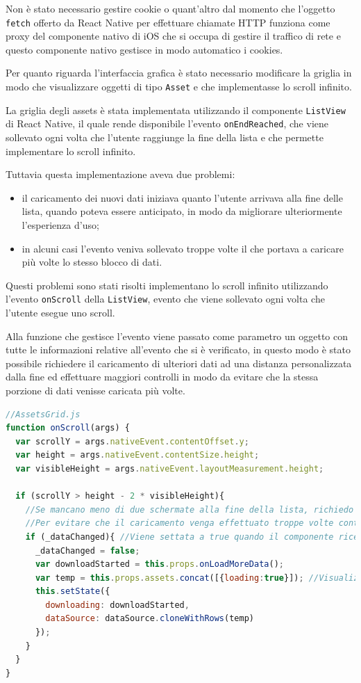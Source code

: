 Non è stato necessario gestire cookie o quant'altro dal momento che l'oggetto \texttt{fetch} offerto da React Native per effettuare chiamate HTTP funziona come proxy del componente nativo di iOS che si occupa di gestire il traffico di rete e questo componente nativo gestisce in modo automatico i cookies.

Per quanto riguarda l'interfaccia grafica è stato necessario modificare la griglia in modo che visualizzare oggetti di tipo \texttt{Asset} e che implementasse lo scroll infinito.

La griglia degli assets è stata implementata utilizzando il componente \texttt{ListView} di React Native, il quale rende disponibile l'evento \texttt{onEndReached}, che viene sollevato ogni volta che l'utente raggiunge la fine della lista e che permette implementare lo scroll infinito. 

Tuttavia questa implementazione aveva due problemi:
\begin{itemize}
\item il caricamento dei nuovi dati iniziava quanto l'utente arrivava alla fine delle lista, quando poteva essere anticipato, in modo da migliorare ulteriormente l'esperienza d'uso;
\item in alcuni casi l'evento veniva sollevato troppe volte il che portava a caricare più volte lo stesso blocco di dati.
\end{itemize}

Questi problemi sono stati risolti implementano lo scroll infinito utilizzando l'evento \texttt{onScroll} della \texttt{ListView}, evento che viene sollevato ogni volta che l'utente esegue uno scroll.

Alla funzione che gestisce l'evento viene passato come parametro un oggetto con tutte le informazioni relative all'evento che si è verificato, in questo modo è stato possibile richiedere il caricamento di ulteriori dati ad una distanza personalizzata dalla fine ed effettuare maggiori controlli in modo da evitare che la stessa porzione di dati venisse caricata più volte.

\begin{lstlisting}[language=JavaScript, caption=Funzione che gestisce l'evento onScroll della griglia che visualizza gli assets]
//AssetsGrid.js
function onScroll(args) {
  var scrollY = args.nativeEvent.contentOffset.y;
  var height = args.nativeEvent.contentSize.height;
  var visibleHeight = args.nativeEvent.layoutMeasurement.height;

  if (scrollY > height - 2 * visibleHeight){
    //Se mancano meno di due schermate alla fine della lista, richiedo il caricamento di ulteriori dati
    //Per evitare che il caricamento venga effettuato troppe volte controllo che i dati siano cambiati rispetto all'ultima volta che ho effettuato il caricamento.
    if (_dataChanged){ //Viene settata a true quando il componente riceve dei dati nuovi
      _dataChanged = false;
      var downloadStarted = this.props.onLoadMoreData();
      var temp = this.props.assets.concat([{loading:true}]); //Visualizza un'indicatore di caricamento
      this.setState({
        downloading: downloadStarted,
        dataSource: dataSource.cloneWithRows(temp)
      });
    }
  }
}
\end{lstlisting}

